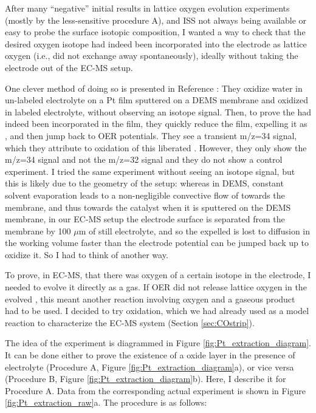 After many ``negative'' initial results in lattice oxygen evolution experiments (mostly by the less-sensitive procedure A), and ISS not always being available or easy to probe the surface isotopic composition, I wanted a way to check that the desired oxygen isotope had indeed been incorporated into the electrode as lattice oxygen (i.e., did not exchange away spontaneously), ideally without taking the electrode out of the EC-MS setup. 

One clever method of doing so is presented in Reference : They oxidize water in un-labeled electrolyte on a Pt film sputtered on a DEMS membrane and oxidized in labeled electrolyte, without observing an isotope signal. Then, to prove the  had indeed been incorporated in the film, they quickly reduce the film, expelling it as , and then jump back to OER potentials. They see a transient m/z=34 signal, which they attribute to oxidation of this liberated . However, they only show the m/z=34 signal and not the m/z=32 signal and they do not show a control experiment. I tried the same experiment without seeing an isotope signal, but this is likely due to the geometry of the setup: whereas in DEMS, constant solvent evaporation leads to a non-negligible convective flow of  towards the membrane, and thus towards the catalyst when it is sputtered on the DEMS membrane, in our EC-MS setup the electrode surface is separated from the membrane by 100 $\mu$m of still electrolyte, and so the expelled  is lost to diffusion in the working volume faster than the electrode potential can be jumped back up to oxidize it. So I had to think of another way.

To prove, in EC-MS, that there was oxygen of a certain isotope in the electrode, I needed to evolve it directly as a gas. If OER did not release lattice oxygen in the evolved , this meant another reaction involving oxygen and a gaseous product had to be used. I decided to try  oxidation, which we had already used as a model reaction to characterize the EC-MS system (Section \ref{sec:COstrip}). 

The idea of the experiment is diagrammed in Figure \ref{fig:Pt_extraction_diagram}. It can be done either to prove the existence of a  oxide layer in the presence of  electrolyte (Procedure A, Figure \ref{fig:Pt_extraction_diagram}a), or vice versa (Procedure B, Figure \ref{fig:Pt_extraction_diagram}b). Here, I describe it for Procedure A. Data from the corresponding actual experiment is shown in Figure \ref{fig:Pt_extraction_raw}a. The procedure is as follows:


